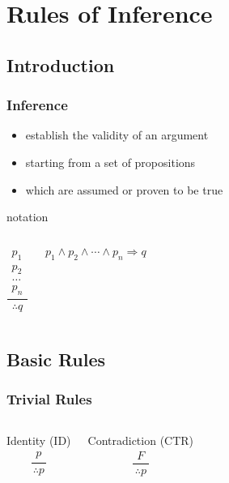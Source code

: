 \documentclass[dvipsnames]{beamer}
\begin{document}
\section{Rules of Inference}

\subsection{Introduction}

\begin{frame}
  \frametitle{Inference}

  \begin{itemize}
    \item establish the validity of an argument
    \item starting from a set of propositions
    \item which are assumed or proven to be true
  \end{itemize}

  \pause
  \begin{block}{notation}
    \begin{columns}
      \[
      \frac
        {
          \begin{array}{c}
            p_1\\
            p_2\\
            \dots\\
            p_n
          \end{array}
        }
        {
          \therefore q
        }
      \]

      $p_1 \wedge p_2 \wedge \cdots \wedge p_n \Rightarrow q$
    \end{columns}
  \end{block}
\end{frame}

\subsection{Basic Rules}

\begin{frame}
  \frametitle{Trivial Rules}

  \begin{columns}
    \begin{block}{Identity (ID)}
      \[
      \frac
        {
          \begin{array}{c}
            p
          \end{array}
        }
        {
          \therefore p
        }
      \]
    \end{block}

    \pause
    \begin{block}{Contradiction (CTR)}
    \[
    \frac
      {
        \begin{array}{c}
          F
        \end{array}
      }
      {
        \therefore p
      }
    \]
    \end{block}
  \end{columns}
\end{frame}
\end{document}
